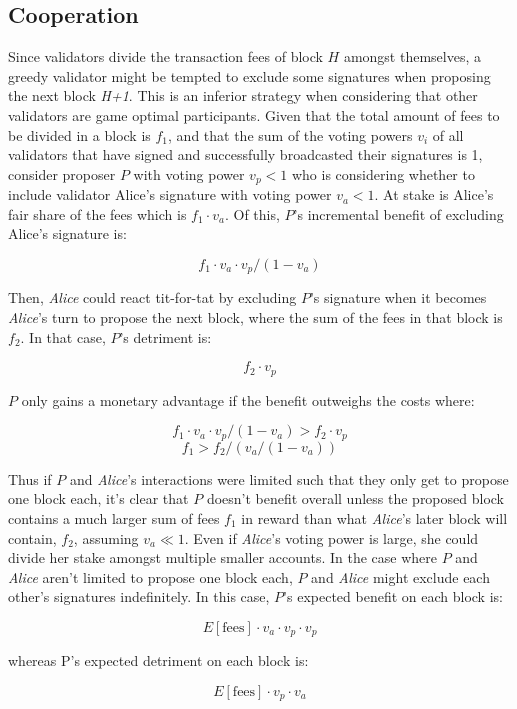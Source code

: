 \documentclass[letter,11pt]{article}
\begin{document}
\subsection{Cooperation} %

Since validators divide the transaction fees of block $H$ amongst themselves, a greedy validator might be tempted to exclude some signatures when proposing the next block \textit{H+1}. This is an inferior strategy when considering that other validators are game optimal participants. Given that the total amount of fees to be divided in a block is $f_1$, and that the sum of the voting powers $v_i$ of all validators that have signed and successfully broadcasted their signatures is 1, consider proposer $P$ with voting power $v_p < 1$ who is considering whether to include validator Alice’s signature with voting power $v_a < 1$. At stake is Alice’s fair share of the fees which is $f_1 \cdot v_a$. Of this, $P$’s incremental benefit of excluding Alice’s signature is:

$$
f_1 \cdot v_a \cdot v_p / (1 - v_a)
$$

Then, \textit{Alice} could react tit-for-tat by excluding $P$’s signature when it becomes \textit{Alice}’s turn to propose the next block, where the sum of the fees in that block is $f_2$. In that case, $P$’s detriment is:

$$
f_2 \cdot v_p
$$

$P$ only gains a monetary advantage if the benefit outweighs the costs where:

$$
f_1 \cdot v_a \cdot v_p / (1 - v_a) > f_2 \cdot v_p
$$
$$
f_1 > f_2 / (v_a / (1 - v_a))
$$

Thus if $P$ and \textit{Alice}’s interactions were limited such that they only get to propose one block each, it’s clear that $P$ doesn’t benefit overall unless the proposed block contains a much larger sum of fees $f_1$ in reward than what \textit{Alice}’s later block will contain, $f_2$, assuming $v_a \ll 1$. Even if \textit{Alice}’s voting power is large, she could divide her stake amongst multiple smaller accounts. In the case where $P$ and \textit{Alice} aren’t limited to propose one block each, $P$ and \textit{Alice} might exclude each other’s signatures indefinitely. In this case, $P$’s expected benefit on each block is:

$$
E[\text{fees}] \cdot v_a \cdot v_p \cdot v_p
$$

whereas P’s expected detriment on each block is:

$$
E[\text{fees}] \cdot v_p \cdot v_a
$$
\end{document}
